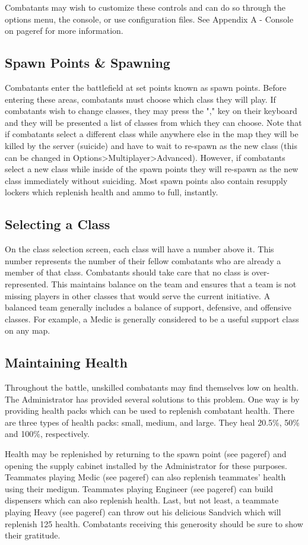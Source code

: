 Combatants may wish to customize these controls and can do so through the options menu, the console, or use configuration files. See Appendix A - Console on {{pageref}} for more information.

\subsection{Spawn Points \& Spawning}
Combatants enter the battlefield at set points known as spawn points. Before entering these areas, combatants must choose which class they will play. If combatants wish to change classes, they may press the "," key on their keyboard and they will be presented a list of classes from which they can choose. Note that if combatants select a different class while anywhere else in the map they will be killed by the server (suicide) and have to wait to re-spawn as the new class (this can be changed in Options>Multiplayer>Advanced). However, if combatants select a new class while inside of the spawn points they will re-spawn as the new class immediately without suiciding. Most spawn points also contain resupply lockers which replenish health and ammo to full, instantly.

\subsection{Selecting a Class}
On the class selection screen, each class will have a number above it. This number represents the number of their fellow combatants who are already a member of that class. Combatants should take care that no class is over-represented.  This maintains balance on the team and ensures that a team is not missing players in other classes that would serve the current initiative. A balanced team generally includes a balance of support, defensive, and offensive classes. For example, a Medic is generally considered to be a useful support class on any map.

\subsection{Maintaining Health}
Throughout the battle, unskilled combatants may find themselves low on health.  The Administrator has provided several solutions to this problem.  One way is by providing health packs which can be used to replenish combatant health.  There are three types of health packs: small, medium, and large.  They heal 20.5\%, 50\% and 100\%, respectively.

Health may be replenished by returning to the spawn point (see {{pageref}}) and opening the supply cabinet installed by the Administrator for these purposes. Teammates playing Medic (see {{pageref}}) can also replenish teammates' health using their medigun. Teammates playing Engineer (see {{pageref}}) can build dispensers which can also replenish health. Last, but not least, a teammate playing Heavy (see {{pageref}}) can throw out his delicious Sandvich which will replenish 125 health.  Combatants receiving this generosity should be sure to show their gratitude.